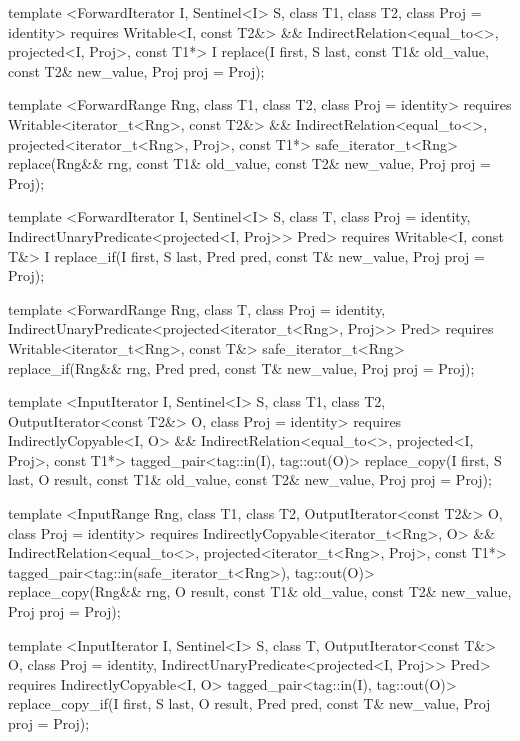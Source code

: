 \begin{codeblock}
{{{{  template <ForwardIterator I, Sentinel<I> S, class T1, class T2, class Proj = identity>
    requires Writable<I, const T2&> &&
      IndirectRelation<equal_to<>, projected<I, Proj>, const T1*>
    I
      replace(I first, S last, const T1& old_value, const T2& new_value, Proj proj = Proj{});

  template <ForwardRange Rng, class T1, class T2, class Proj = identity>
    requires Writable<iterator_t<Rng>, const T2&> &&
      IndirectRelation<equal_to<>, projected<iterator_t<Rng>, Proj>, const T1*>
    safe_iterator_t<Rng>
      replace(Rng&& rng, const T1& old_value, const T2& new_value, Proj proj = Proj{});

  template <ForwardIterator I, Sentinel<I> S, class T, class Proj = identity,
      IndirectUnaryPredicate<projected<I, Proj>> Pred>
    requires Writable<I, const T&>
    I
      replace_if(I first, S last, Pred pred, const T& new_value, Proj proj = Proj{});

  template <ForwardRange Rng, class T, class Proj = identity,
      IndirectUnaryPredicate<projected<iterator_t<Rng>, Proj>> Pred>
    requires Writable<iterator_t<Rng>, const T&>
    safe_iterator_t<Rng>
      replace_if(Rng&& rng, Pred pred, const T& new_value, Proj proj = Proj{});

  template <InputIterator I, Sentinel<I> S, class T1, class T2, OutputIterator<const T2&> O,
      class Proj = identity>
    requires IndirectlyCopyable<I, O> &&
      IndirectRelation<equal_to<>, projected<I, Proj>, const T1*>
    tagged_pair<tag::in(I), tag::out(O)>
      replace_copy(I first, S last, O result, const T1& old_value, const T2& new_value,
                   Proj proj = Proj{});

  template <InputRange Rng, class T1, class T2, OutputIterator<const T2&> O,
      class Proj = identity>
    requires IndirectlyCopyable<iterator_t<Rng>, O> &&
      IndirectRelation<equal_to<>, projected<iterator_t<Rng>, Proj>, const T1*>
    tagged_pair<tag::in(safe_iterator_t<Rng>), tag::out(O)>
      replace_copy(Rng&& rng, O result, const T1& old_value, const T2& new_value,
                   Proj proj = Proj{});

  template <InputIterator I, Sentinel<I> S, class T, OutputIterator<const T&> O,
      class Proj = identity, IndirectUnaryPredicate<projected<I, Proj>> Pred>
    requires IndirectlyCopyable<I, O>
    tagged_pair<tag::in(I), tag::out(O)>
      replace_copy_if(I first, S last, O result, Pred pred, const T& new_value,
                      Proj proj = Proj{});

}}}}
\end{codeblock}
